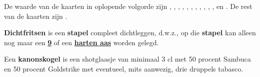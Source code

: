 \item \label{item:kaarten_2} De waarde van de kaarten in oplopende volgorde zijn , , , , , , , , , , ,  en . De rest van de kaarten zijn .

\item \textbf{Dichtfritsen} is een \textbf{stapel} compleet dichtleggen, d.w.z., op die \textbf{stapel} kan alleen nog maar een \ul{\textbf{9}} of een \ul{\textbf{harten aas}} worden gelegd.



\item \label{item:kanonskogel} Een \textbf{kanonskogel} is een shotglaasje van minimaal 3 cl met 50 procent Sambuca en 50 procent Goldstrike met eventueel, mits aanwezig, drie druppels tabasco.

\eindABCLijst

